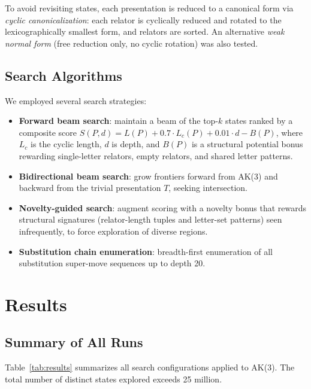\documentclass[12pt,a4paper]{article}
\begin{document}
To avoid revisiting states, each presentation is reduced to a canonical form via \emph{cyclic canonicalization}: each relator is cyclically reduced and rotated to the lexicographically smallest form, and relators are sorted. An alternative \emph{weak normal form} (free reduction only, no cyclic rotation) was also tested.

\subsection{Search Algorithms}

We employed several search strategies:

\begin{itemize}
  \item \textbf{Forward beam search}: maintain a beam of the top-$k$ states ranked by a composite score $S(P,d) = L(P) + 0.7\cdot L_c(P) + 0.01\cdot d - B(P)$, where $L_c$ is the cyclic length, $d$ is depth, and $B(P)$ is a structural potential bonus rewarding single-letter relators, empty relators, and shared letter patterns.
  \item \textbf{Bidirectional beam search}: grow frontiers forward from AK(3) and backward from the trivial presentation $T$, seeking intersection.
  \item \textbf{Novelty-guided search}: augment scoring with a novelty bonus that rewards structural signatures (relator-length tuples and letter-set patterns) seen infrequently, to force exploration of diverse regions.
  \item \textbf{Substitution chain enumeration}: breadth-first enumeration of all substitution super-move sequences up to depth 20.
\end{itemize}

\section{Results}

\subsection{Summary of All Runs}

Table~\ref{tab:results} summarizes all search configurations applied to AK(3). The total number of distinct states explored exceeds 25 million.
\end{document}
